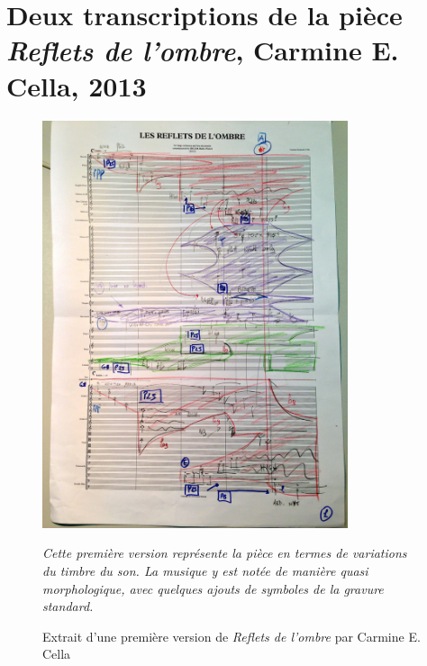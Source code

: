 
\section{Deux transcriptions de la pièce \textit{Reflets de l'ombre}, Carmine E. Cella, 2013}
\label{sec:refletsDeLOmbre}
\begin{figure}[H]
	\centering
	\includegraphics[keepaspectratio=true, width=0.8\textwidth]{Annexes/i/refletsDeLOmbreFantaisie.jpg}
	\caption{Extrait d'une première version de \textit{Reflets de l'ombre} par Carmine E. Cella}
	\medskip
	\small
	\textit{Cette première version représente la pièce en termes de variations du timbre du son.
	La musique y est notée de manière quasi morphologique, avec quelques ajouts de symboles de la gravure standard.}	
	\label{fig:refletsDeLOmbreFantaisie}
\end{figure}

